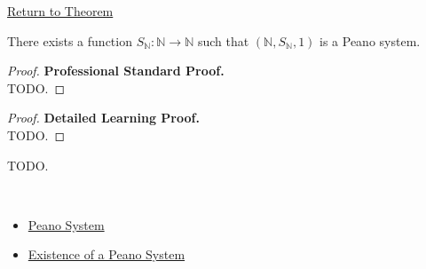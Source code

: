 \newpage
{}
\label{prf:natural-numbers-form-a-peano-system}

\begin{remark*}[Return]
\hyperref[thm:natural-numbers-form-a-peano-system]{Return to Theorem}
\end{remark*}

\begin{theorem*}
There exists a function $S_{\mathbb{N}}:\mathbb{N}\to\mathbb{N}$ such that
$(\mathbb{N},S_{\mathbb{N}},1)$ is a Peano system.
\end{theorem*}

\begin{proof}
\textbf{Professional Standard Proof.}~\\
TODO.
\end{proof}

\begin{proof}
\textbf{Detailed Learning Proof.}~\\
TODO.
\end{proof}

\begin{remark*}
TODO.
\end{remark*}

\begin{remark*}[Dependencies]~\\
\begin{itemize}
  \item \hyperref[def:peano-system]{Peano System}
  \item \hyperref[ax:peano-system-existence]{Existence of a Peano System}
\end{itemize}
\end{remark*}